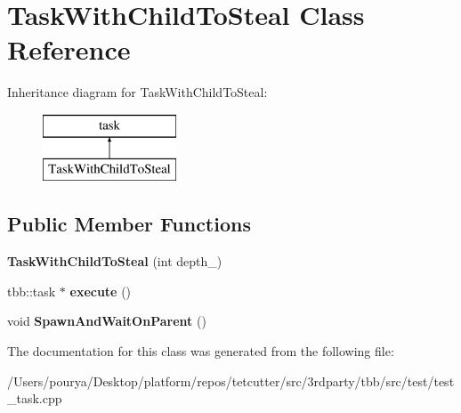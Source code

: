 \hypertarget{classTaskWithChildToSteal}{}\section{Task\+With\+Child\+To\+Steal Class Reference}
\label{classTaskWithChildToSteal}
Inheritance diagram for Task\+With\+Child\+To\+Steal\+:\begin{figure}[H]
\begin{center}
\leavevmode
\includegraphics[height=2.000000cm]{classTaskWithChildToSteal}
\end{center}
\end{figure}
\subsection*{Public Member Functions}
\begin{DoxyCompactItemize}
\item 
\hypertarget{classTaskWithChildToSteal_ac5783f1cf9f342774145cc4bcfeadad9}{}{\bfseries Task\+With\+Child\+To\+Steal} (int depth\+\_\+)\label{classTaskWithChildToSteal_ac5783f1cf9f342774145cc4bcfeadad9}

\item 
\hypertarget{classTaskWithChildToSteal_a19e42a4a9207881d990bfef1f3fb82e6}{}tbb\+::task $\ast$ {\bfseries execute} ()\label{classTaskWithChildToSteal_a19e42a4a9207881d990bfef1f3fb82e6}

\item 
\hypertarget{classTaskWithChildToSteal_a33d83614137842858713156a7c77e1f4}{}void {\bfseries Spawn\+And\+Wait\+On\+Parent} ()\label{classTaskWithChildToSteal_a33d83614137842858713156a7c77e1f4}

\end{DoxyCompactItemize}


The documentation for this class was generated from the following file\+:\begin{DoxyCompactItemize}
\item 
/\+Users/pourya/\+Desktop/platform/repos/tetcutter/src/3rdparty/tbb/src/test/test\+\_\+task.\+cpp\end{DoxyCompactItemize}
